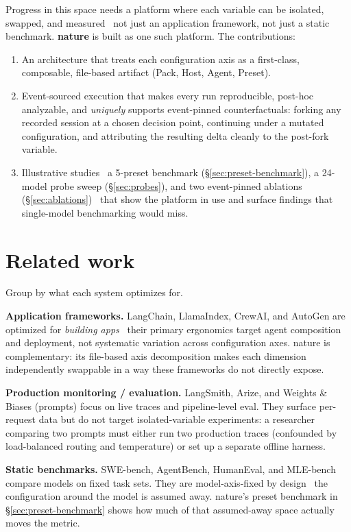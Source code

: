 \documentclass[11pt,a4paper]{article}
\begin{document}
Progress in this space needs a platform where each variable can be
isolated, swapped, and measured \textemdash\ not just an
application framework, not just a static benchmark. \textbf{nature}
is built as one such platform. The contributions:

\begin{enumerate}[leftmargin=*,itemsep=2pt,topsep=2pt]
\item An architecture that treats each configuration axis as a
      first-class, composable, file-based artifact (Pack, Host,
      Agent, Preset).
\item Event-sourced execution that makes every run reproducible,
      post-hoc analyzable, and \emph{uniquely} supports
      event-pinned counterfactuals: forking any recorded session
      at a chosen decision point, continuing under a mutated
      configuration, and attributing the resulting delta cleanly
      to the post-fork variable.
\item Illustrative studies \textemdash\ a 5-preset benchmark
      (\S\ref{sec:preset-benchmark}), a 24-model probe sweep
      (\S\ref{sec:probes}), and two event-pinned ablations
      (\S\ref{sec:ablations}) \textemdash\ that show the platform
      in use and surface findings that single-model benchmarking
      would miss.
\end{enumerate}

\section{Related work}

Group by what each system optimizes for.

\textbf{Application frameworks.} LangChain, LlamaIndex, CrewAI,
and AutoGen are optimized for \emph{building apps} \textemdash\
their primary ergonomics target agent composition and deployment,
not systematic variation across configuration axes. nature is
complementary: its file-based axis decomposition makes each
dimension independently swappable in a way these frameworks do
not directly expose.

\textbf{Production monitoring / evaluation.} LangSmith, Arize,
and Weights \& Biases (prompts) focus on live traces and
pipeline-level eval. They surface per-request data but do not
target isolated-variable experiments: a researcher comparing two
prompts must either run two production traces (confounded by
load-balanced routing and temperature) or set up a separate
offline harness.

\textbf{Static benchmarks.} SWE-bench, AgentBench, HumanEval,
and MLE-bench compare models on fixed task sets. They are
model-axis-fixed by design \textemdash\ the configuration around
the model is assumed away. nature's preset benchmark in
\S\ref{sec:preset-benchmark} shows how much of that assumed-away
space actually moves the metric.
\end{document}
